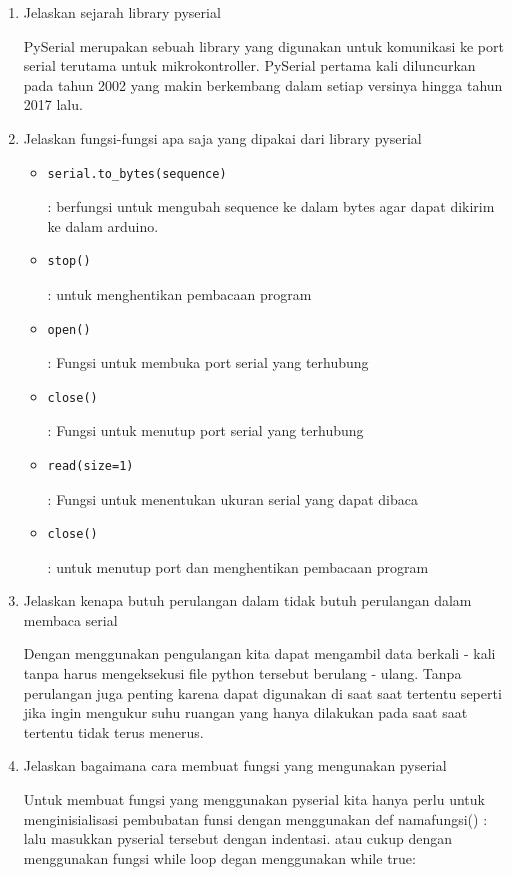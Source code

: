 \begin{enumerate}
	\item Jelaskan sejarah library pyserial
	\par
	PySerial merupakan sebuah library yang digunakan untuk komunikasi ke port serial terutama untuk mikrokontroller. PySerial pertama kali diluncurkan pada tahun 2002 yang makin berkembang dalam setiap versinya hingga tahun 2017 lalu.
	
	\item Jelaskan fungsi-fungsi apa saja yang dipakai dari library pyserial
		\begin{itemize}
			\item \begin{verbatim}serial.to_bytes(sequence)\end{verbatim} : berfungsi untuk mengubah sequence ke dalam bytes agar dapat dikirim ke dalam arduino.
			\item \begin{verbatim}stop()\end{verbatim} : untuk menghentikan pembacaan program
			\item \begin{verbatim}open()\end{verbatim} : Fungsi untuk membuka port serial yang terhubung
			\item \begin{verbatim}close()\end{verbatim} : Fungsi untuk menutup port serial yang terhubung
			\item \begin{verbatim}read(size=1) \end{verbatim} : Fungsi untuk menentukan ukuran serial yang dapat dibaca
			\item \begin{verbatim}close()\end{verbatim} : untuk menutup port dan menghentikan pembacaan program
		\end{itemize}
	
	\item Jelaskan kenapa butuh perulangan dalam tidak butuh perulangan dalam membaca serial
	\par
	Dengan menggunakan pengulangan kita dapat mengambil data berkali - kali tanpa harus mengeksekusi file python tersebut berulang - ulang. Tanpa perulangan juga penting karena dapat digunakan di saat saat tertentu seperti jika ingin mengukur suhu ruangan yang hanya dilakukan pada saat saat tertentu tidak terus menerus.
	
	\item Jelaskan bagaimana cara membuat fungsi yang mengunakan pyserial
	\par
	Untuk membuat fungsi yang menggunakan pyserial kita hanya perlu untuk menginisialisasi pembubatan funsi dengan menggunakan def namafungsi() : lalu masukkan pyserial tersebut dengan indentasi. atau cukup dengan menggunakan fungsi while loop degan menggunakan while true:
	
\end{enumerate}